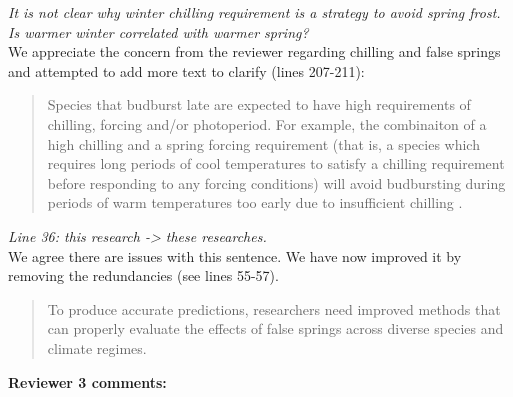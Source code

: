 \documentclass[11pt,a4paper]{article}
\begin{document}
\textit{It is not clear why winter chilling requirement is a strategy to avoid spring frost. Is warmer winter correlated with warmer spring?} \\

We appreciate the concern from the reviewer regarding chilling and false springs and attempted to add more text to clarify (lines 207-211): \\

\begin{quotation}
Species that budburst late are expected to have high requirements of chilling, forcing and/or photoperiod. For example, the combinaiton of a high chilling and a spring forcing requirement (that is, a species which requires long periods of cool temperatures to satisfy a chilling requirement before responding to any forcing conditions) will avoid budbursting during periods of warm temperatures too early due to insufficient chilling \citep{Basler2012}.
\end{quotation} 

\textit{Line 36: this research -> these researches.}\\

We agree there are issues with this sentence. We have now improved it by removing the redundancies (see lines 55-57). \\ 

\begin{quotation}
To produce accurate predictions, researchers need improved methods that can properly evaluate the effects of false springs across diverse species and climate regimes. 
\end{quotation} 

\textbf{ Reviewer 3 comments:} \\
\end{document}
